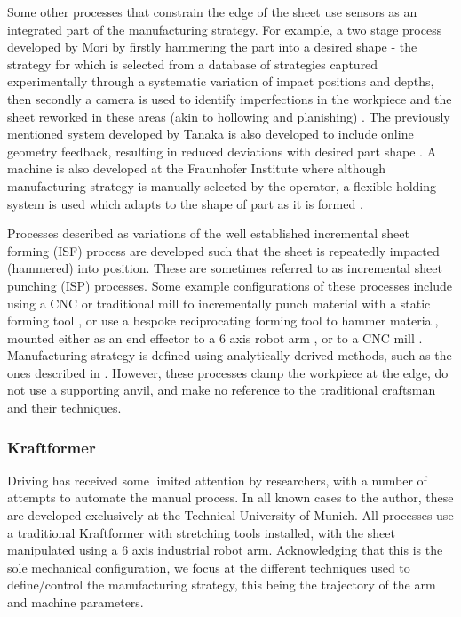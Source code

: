 Some other processes that constrain the edge of the sheet use sensors as an integrated part of the manufacturing strategy.  For example, a two stage process developed by Mori by firstly hammering the part into a desired shape -  the strategy for which is selected from a database of strategies captured experimentally through a systematic variation of impact positions and depths, then secondly a camera is used to identify imperfections in the workpiece and the sheet reworked in these areas (akin to hollowing and planishing) \citep{Mori1998IncrementalDatabase}. The previously mentioned system developed by Tanaka is also developed to include online geometry feedback, resulting  in reduced deviations with desired part shape \citep{Tanaka2014DevelopmentHammering}. A machine is also developed at the Fraunhofer Institute where although manufacturing strategy is manually selected by the operator, a flexible holding system is used which adapts to the shape of part as it is formed \citep{Sharon2014FraunhoferReport}.

Processes described as variations of the well established incremental sheet forming (ISF) process are developed such that the sheet is repeatedly impacted (hammered) into position. These are sometimes referred to as incremental sheet punching (ISP) processes. Some example configurations of these processes include using a CNC or traditional mill to incrementally punch material with a static forming tool \citep{Wang2017IncrementalPath,Zhu2019ToolForming}, or use a bespoke reciprocating forming tool to hammer material, mounted either as an end effector to a 6 axis robot arm \citep{Schafer2005IncrementalRobots, Puzik2008IncrementalApplication, Luo2010AResults}, or to a CNC mill \citep{Asgari2017DesignDamper}. Manufacturing strategy is defined using analytically derived methods, such as the ones described in \citep{Sedighi2015AnProcess,Zhu2019ToolForming,Luo2010ASimulation}. However, these processes clamp the workpiece at the edge, do not use a supporting anvil, and make no reference to the traditional craftsman and their techniques.
 

\subsubsection*{Kraftformer} \label{sec:MechKraftformer}
Driving has received some limited attention by researchers, with a number of attempts to automate the manual process. In all known cases to the author, these are developed exclusively at the Technical University of Munich. All processes use a traditional Kraftformer with stretching tools installed, with the sheet manipulated using a 6 axis industrial robot arm. Acknowledging that this is the sole mechanical configuration, we focus at the different techniques used to define/control the manufacturing strategy, this being the trajectory of the arm and machine parameters.

